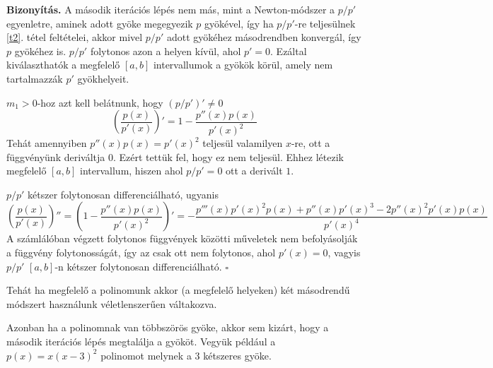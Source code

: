 \documentclass[a4paper,12pt]{report}
\newenvironment{Biz}{\noindent \textbf{Bizonyítás. }}{ $\square$}
\begin{document}
                
                
                
                
                
                
                
                
                
                
                
                
                
                
                
                
                
                
                
				\begin{Biz}
				    A második iterációs lépés nem más, mint a Newton-módszer a $p/p'$ egyenletre, aminek adott gyöke megegyezik $p$ gyökével, így ha $p/p'$-re teljesülnek \ref{t2}. tétel feltételei, akkor mivel $p/p'$ adott gyökéhez másodrendben konvergál, így $p$ gyökéhez is. $p/p'$ folytonos azon a helyen kívül, ahol $p'=0$. Ezáltal kiválaszthatók a megfelelő $[a,b]$ intervallumok a gyökök körül, amely nem tartalmazzák $p'$ gyökhelyeit. 
				    
				    $m_1>0$-hoz azt kell belátnunk, hogy $(p/p')'\neq 0$
				    \[\left( \frac{p(x)}{p'(x)} \right)'=1-\frac{p''(x)p(x)}{p'(x)^2}\]
				    Tehát amennyiben $p''(x)p(x)=p'(x)^2$ teljesül valamilyen $x$-re, ott a függvényünk deriváltja $0$. Ezért tettük fel, hogy ez nem teljesül. Ehhez létezik megfelelő $[a,b]$ intervallum, hiszen ahol $p/p'=0$ ott a derivált $1$.
				    
				    $p/p'$ kétszer folytonosan differenciálható, ugyanis
				    \[\left( \frac{p(x)}{p'(x)} \right)''=\left(1-\frac{p''(x)p(x)}{p'(x)^2}\right)'=-\frac{p'''(x)p'(x)^2p(x)+p''(x)p'(x)^3-2p''(x)^2p'(x)p(x)}{p'(x)^4}\]
				    A számlálóban végzett folytonos függvények közötti műveletek nem befolyásolják a függvény folytonosságát, így az csak ott nem folytonos, ahol $p'(x)=0$, vagyis $p/p'$ $[a,b]$-n kétszer folytonosan differenciálható.
				\end{Biz}
				
				Tehát ha megfelelő a polinomunk akkor (a megfelelő helyeken) két másodrendű módszert használunk véletlenszerűen váltakozva.

				Azonban ha a polinomnak van többszörös gyöke, akkor sem kizárt, hogy a második iterációs lépés megtalálja a gyököt. Vegyük például a $p(x)=x(x-3)^2$ polinomot melynek a $3$ kétszeres gyöke. 
\end{document}
